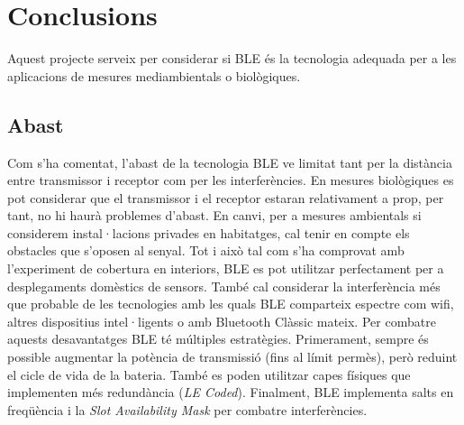 \cleardoublepage
{}
\chapter*{Conclusions}

Aquest projecte serveix per considerar si BLE és la tecnologia adequada per a les aplicacions de mesures mediambientals o biològiques.



\section*{Abast}

Com s'ha comentat, l'abast de la tecnologia BLE ve limitat tant per la distància entre transmissor i receptor com per les interferències.
En mesures biològiques es pot considerar que el transmissor i el receptor estaran relativament a prop, per tant, no hi haurà problemes d'abast.
En canvi, per a mesures ambientals si considerem instal·lacions privades en habitatges, cal tenir en compte els obstacles que s'oposen al senyal.
Tot i això tal com s'ha comprovat amb l'experiment de cobertura en interiors, BLE es pot utilitzar perfectament per a desplegaments domèstics de sensors.
També cal considerar la interferència més que probable de les tecnologies amb les quals BLE comparteix espectre com wifi, altres dispositius intel·ligents o amb Bluetooth Clàssic mateix.
Per combatre aquests desavantatges BLE té múltiples estratègies.
Primerament, sempre és possible augmentar la potència de transmissió (fins al límit permès), però reduint el cicle de vida de la bateria.
També es poden utilitzar capes físiques que implementen més redundància (\textit{LE Coded}).
Finalment, BLE implementa salts en freqüència i la \textit{Slot Availability Mask} per combatre interferències.

